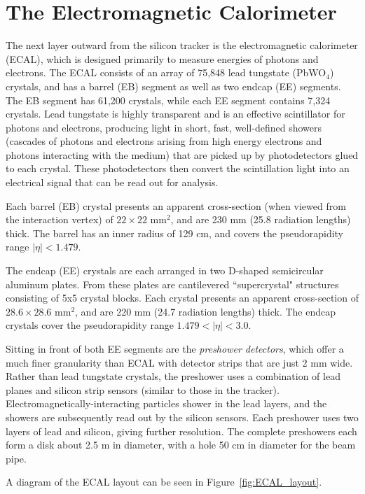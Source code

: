\section{The Electromagnetic Calorimeter}

The next layer outward from the silicon tracker is the electromagnetic calorimeter (ECAL), which is designed primarily to measure energies of photons and electrons. The ECAL consists of an array of 75,848 lead tungstate (PbWO$_4$) crystals, and has a barrel (EB) segment as well as two endcap (EE) segments. The EB segment has 61,200 crystals, while each EE segment contains 7,324 crystals. Lead tungstate is highly transparent and is an effective scintillator for photons and electrons, producing light in short, fast, well-defined showers (cascades of photons and electrons arising from high energy electrons and photons interacting with the medium) that are picked up by photodetectors glued to each crystal. These photodetectors then convert the scintillation light into an electrical signal that can be read out for analysis. 

Each barrel (EB) crystal presents an apparent cross-section (when viewed from the interaction vertex) of $22\times22$  mm$^2$, and are 230 mm (25.8 radiation lengths) thick. The barrel has an inner radius of 129 cm, and covers the pseudorapidity range $|\eta| < 1.479$\cite{TDR}.

The endcap (EE) crystals are each arranged in two D-shaped semicircular aluminum plates. From these plates are cantilevered ``supercrystal" structures consisting of 5x5 crystal blocks. Each crystal presents an apparent cross-section of $28.6\times28.6$ mm$^2$, and are 220 mm (24.7 radiation lengths) thick. The endcap crystals cover the pseudorapidity range $1.479 < |\eta| < 3.0$\cite{ECAL}.

Sitting in front of both EE segments are the \textit{preshower detectors}, which offer a much finer granularity than ECAL with detector strips that are just 2 mm wide. Rather than lead tungstate crystals, the preshower uses a combination of lead planes and silicon strip sensors (similar to those in the tracker). Electromagnetically-interacting particles shower in the lead layers, and the showers are subsequently read out by the silicon sensors. Each preshower uses two layers of lead and silicon, giving further resolution. The complete preshowers each form a disk about 2.5 m in diameter, with a hole 50 cm in diameter for the beam pipe.

A diagram of the ECAL layout can be seen in Figure~\ref{fig:ECAL_layout}.

